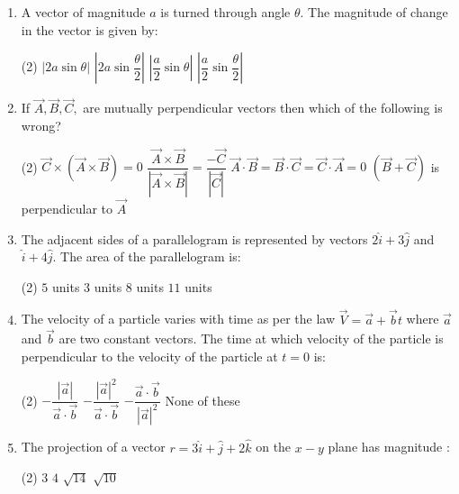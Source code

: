 \documentclass{article}
\renewcommand{\ans}{\quad}
\begin{document}
\pagebreak

\begin{enumerate}
    \item A vector of magnitude $a$ is turned through angle $\theta$. The magnitude of change in the vector is given by:
        \begin{tasks}(2)
            \task $|2a\sin \theta|$
            \task $|2a\sin\dfrac{\theta}{2}|$\ans
            \task $\left|\dfrac{a}{2}\sin \theta\right| $
            \task $\left|\dfrac{a}{2}\sin \dfrac{\theta}{2}\right|$
        \end{tasks}

    \item If $\vec{A}, \vec{B}, \vec{C},$ are mutually perpendicular vectors then which of the following is wrong?
        \begin{tasks}(2)
            \task $\vec{C} \times (\vec{A} \times \vec{B})=0$
            \task $\dfrac{\vec{A} \times \vec{B}}{|\vec{A} \times \vec{B}|}=\dfrac{-\vec{C}}{|\vec{C}|}$ \ans
            \task $\vec{A} \cdot \vec{B}=\vec{B} \cdot \vec{C}=\vec{C} \cdot \vec{A}=0$
            \task $(\vec{B} + \vec{C})$ is perpendicular to $\vec{A}$
        \end{tasks}
    
    \item The adjacent sides of a parallelogram is represented by vectors $2\hat{i}+3\hat{j}$ and $\hat{i}+4\hat{j}$. The area of the parallelogram is:
        \begin{tasks}(2)
            \task $5$ units \ans
            \task $3$ units
            \task $8$ units
            \task $11$ units
        \end{tasks}

    \item The velocity of a particle varies with time as per the law $\vec{V}=\vec{a}+\vec{b}t $ where $\vec{a}$ and $\vec{b}$ are two constant vectors. The time at which velocity of the particle is perpendicular to the velocity of the particle at $t=0$ is:
        \begin{tasks}(2)
        \task $-\dfrac{|\vec{a}|}{\vec{a} \cdot \vec{b}}$
        \task $-\dfrac{|\vec{a}|^2}{\vec{a} \cdot \vec{b}}$\ans
        \task $-\dfrac{\vec{a} \cdot \vec{b}}{|\vec{a}|^2}$
        \task None of these
        \end{tasks}	
        
        
    \item The projection of a vector $r=3\hat{i} + \hat{j} + 2\hat{k}$ on the $x-y$ plane has magnitude :
        \begin{tasks}(2)
        \task $3$
        \task $4$
        \task $\sqrt{14}$
        \task $\sqrt{10}$\ans
        \end{tasks}


\end{enumerate}
\end{document}
